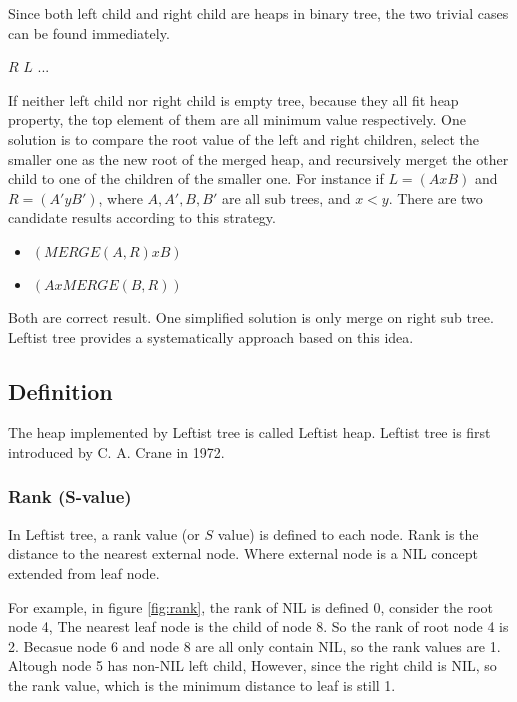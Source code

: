 \documentclass{article}
\begin{document}
Since both left child and right child are heaps in binary tree, the two trivial
cases can be found immediately.

\begin{algorithmic}[1]
    \State \Return $R$
    \State \Return $L$
  \Else
    \State $...$
  \EndIf
\EndFunction
\end{algorithmic}

If neither left child nor right child is empty tree, because they all fit
heap property, the top element of them are all minimum value respectively.
One solution is to compare the root value of the left and right children,
select the smaller one as the new root of the merged heap, and recursively
merget the other child to one of the children of the smaller one. 
For instance if $L = (A x B)$ and $R = (A' y B')$, where $A, A', B, B'$ 
are all sub trees, and $x < y$. There are two candidate results according
to this strategy.

\begin{itemize}
\item $(MERGE(A, R) x B)$
\item $(A x MERGE(B, R))$
\end{itemize}

Both are correct result. One simplified solution is only merge on right
sub tree. Leftist tree provides a systematically approach based on this
idea.

\subsection{Definition}

The heap implemented by Leftist tree is called Leftist heap. Leftist
tree is first introduced by C. A. Crane in 1972\cite{wiki-leftist-tree}.

\subsubsection{Rank (S-value)}

In Leftist tree, a rank value (or $S$ value) is defined to each node. 
Rank is the distance to the nearest external node. Where external node
is a NIL concept extended from leaf node.

For example, in figure \ref{fig:rank}, the rank of NIL 
is defined 0, consider the root node 4, The nearest leaf node is 
the child of node 8. So the rank of root node 4 is 2. Becasue node 
6 and node 8 are all only contain NIL, so the rank values are 1. 
Altough node 5 has non-NIL left child, However, since the right 
child is NIL, so the rank value, which is the minimum distance 
to leaf is still 1.
\end{document}
